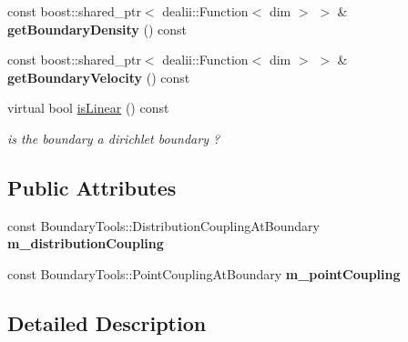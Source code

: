 \begin{DoxyCompactItemize}
\item 
\hypertarget{classnatrium_1_1LinearFluxBoundary_a6e1ab8aa7ece5c165e36363e81c5b521}{
const boost::shared\_\-ptr$<$ dealii::Function$<$ dim $>$ $>$ \& {\bfseries getBoundaryDensity} () const }
\label{classnatrium_1_1LinearFluxBoundary_a6e1ab8aa7ece5c165e36363e81c5b521}

\item 
\hypertarget{classnatrium_1_1LinearFluxBoundary_ab631d4d94882bb2a29002498d2ddb34c}{
const boost::shared\_\-ptr$<$ dealii::Function$<$ dim $>$ $>$ \& {\bfseries getBoundaryVelocity} () const }
\label{classnatrium_1_1LinearFluxBoundary_ab631d4d94882bb2a29002498d2ddb34c}

\item 
\hypertarget{classnatrium_1_1LinearFluxBoundary_ad13f51e17a0fb420ef8d6d090af73b34}{
virtual bool \hyperlink{classnatrium_1_1LinearFluxBoundary_ad13f51e17a0fb420ef8d6d090af73b34}{isLinear} () const }
\label{classnatrium_1_1LinearFluxBoundary_ad13f51e17a0fb420ef8d6d090af73b34}

\begin{DoxyCompactList}\small\item\em is the boundary a dirichlet boundary ? \item\end{DoxyCompactList}\end{DoxyCompactItemize}
\subsection*{Public Attributes}
\begin{DoxyCompactItemize}
\item 
\hypertarget{classnatrium_1_1LinearFluxBoundary_a43cb1a741dedeef2b4bb190b01276806}{
const BoundaryTools::DistributionCouplingAtBoundary {\bfseries m\_\-distributionCoupling}}
\label{classnatrium_1_1LinearFluxBoundary_a43cb1a741dedeef2b4bb190b01276806}

\item 
\hypertarget{classnatrium_1_1LinearFluxBoundary_ab94f9bae96855ffc67e7b8f1745fecd4}{
const BoundaryTools::PointCouplingAtBoundary {\bfseries m\_\-pointCoupling}}
\label{classnatrium_1_1LinearFluxBoundary_ab94f9bae96855ffc67e7b8f1745fecd4}

\end{DoxyCompactItemize}


\subsection{Detailed Description}
